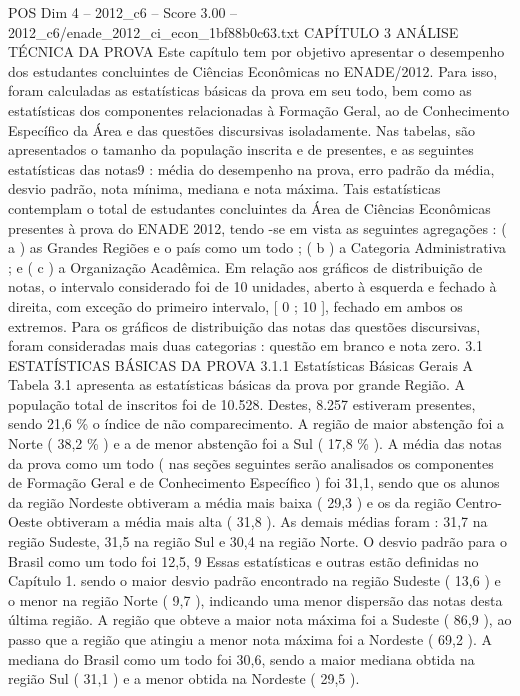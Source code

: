 \begin{textsample}{POS Dim 4 – 2012\_c6 – Score 3.00 – 2012\_c6/enade\_2012\_ci\_econ\_1bf88b0c63.txt}  \label{ex:f4_pos_121}
CAPÍTULO 3 ANÁLISE TÉCNICA DA PROVA Este capítulo tem por objetivo apresentar o desempenho dos estudantes concluintes de Ciências Econômicas no ENADE/2012.
Para isso, foram calculadas as estatísticas básicas da prova em seu todo, bem como as estatísticas dos componentes relacionadas à Formação Geral, ao de Conhecimento Específico da Área e das questões discursivas isoladamente.
Nas tabelas, são apresentados o tamanho da população inscrita e de presentes, e as seguintes estatísticas das notas9 : média do desempenho na prova, erro padrão da média, desvio padrão, nota mínima, mediana e nota máxima.
Tais estatísticas contemplam o total de estudantes concluintes da Área de Ciências Econômicas presentes à prova do ENADE 2012, tendo -se em vista as seguintes agregações : ( a ) as Grandes Regiões e o país como um todo ; ( b ) a Categoria Administrativa ; e ( c ) a Organização Acadêmica.
Em relação aos gráficos de distribuição de notas, o intervalo considerado foi de 10 unidades, aberto à esquerda e fechado à direita, com exceção do primeiro intervalo, [ 0 ; 10 ], fechado em ambos os extremos.
Para os gráficos de distribuição das notas das questões discursivas, foram consideradas mais duas categorias : questão em branco e nota zero. 3.1 ESTATÍSTICAS BÁSICAS DA PROVA 3.1.1 Estatísticas Básicas Gerais A Tabela 3.1 apresenta as estatísticas básicas da prova por grande Região.
A população total de inscritos foi de 10.528.
Destes, 8.257 estiveram presentes, sendo 21,6 \% o índice de não comparecimento.
A região de maior abstenção foi a Norte ( 38,2 \% ) e a de menor abstenção foi a Sul ( 17,8 \% ).
A média das notas da prova como um todo ( nas seções seguintes serão analisados os componentes de Formação Geral e de Conhecimento Específico ) foi 31,1, sendo que os alunos da região Nordeste obtiveram a média mais baixa ( 29,3 ) e os da região Centro-Oeste obtiveram a média mais alta ( 31,8 ).
As demais médias foram : 31,7 na região Sudeste, 31,5 na região Sul e 30,4 na região Norte.
O desvio padrão para o Brasil como um todo foi 12,5, 9 Essas estatísticas e outras estão definidas no Capítulo 1. sendo o maior desvio padrão encontrado na região Sudeste ( 13,6 ) e o menor na região Norte ( 9,7 ), indicando uma menor dispersão das notas desta última região.
A região que obteve a maior nota máxima foi a Sudeste ( 86,9 ), ao passo que a região que atingiu a menor nota máxima foi a Nordeste ( 69,2 ).
A mediana do Brasil como um todo foi 30,6, sendo a maior mediana obtida na região Sul ( 31,1 ) e a menor obtida na Nordeste ( 29,5 ).

\end{textsample}
